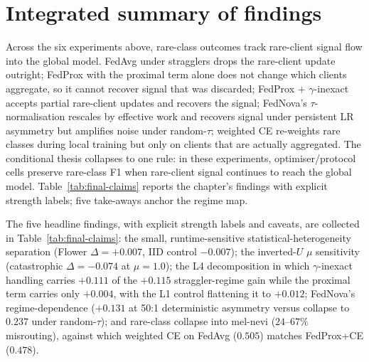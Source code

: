 \documentclass[11pt,a4paper]{report}
\begin{document}


\section{Integrated summary of findings}
\label{sec:integrated-summary}

Across the six experiments above, rare-class outcomes track rare-client
signal flow into the global model. FedAvg under stragglers drops the
rare-client update outright; FedProx with the proximal term alone does
not change which clients aggregate, so it cannot recover signal that was
discarded; FedProx + $\gamma$-inexact accepts partial rare-client updates
and recovers the signal; FedNova's $\tau$-normalisation rescales by
effective work and recovers signal under persistent LR asymmetry but
amplifies noise under random-$\tau$; weighted CE re-weights rare classes
during local training but only on clients that are actually aggregated.
The conditional thesis collapses to one rule: in these experiments,
optimiser/protocol cells preserve rare-class F1 when rare-client signal
continues to reach the global model. Table~\ref{tab:final-claims} reports the chapter's findings
with explicit strength labels; five take-aways anchor the regime map.

The five headline findings, with explicit strength labels and caveats, are
collected in Table~\ref{tab:final-claims}: the small, runtime-sensitive
statistical-heterogeneity separation (Flower $\Delta = +0.007$, IID control
$-0.007$); the inverted-$U$ $\mu$ sensitivity (catastrophic $\Delta = -0.074$ at
$\mu = 1.0$); the L4 decomposition in which $\gamma$-inexact handling carries
$+0.111$ of the $+0.115$ straggler-regime gain while the proximal term carries
only $+0.004$, with the L1 control flattening it to $+0.012$; FedNova's
regime-dependence ($+0.131$ at 50:1 deterministic asymmetry versus collapse to
$0.237$ under random-$\tau$); and rare-class collapse into mel-nevi ($24$--$67\%$
misrouting), against which weighted CE on FedAvg ($0.505$) matches FedProx+CE
($0.478$).
\end{document}
